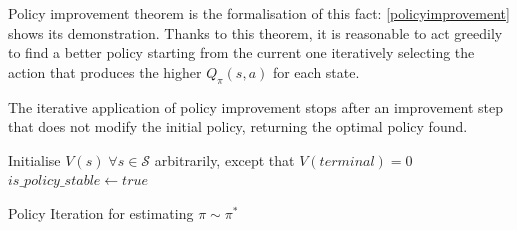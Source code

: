 Policy improvement theorem is the formalisation of this fact: \vref{policyimprovement} shows its demonstration. Thanks to this theorem, it is reasonable to act greedily to find a better policy starting from the current one iteratively selecting the action that produces the higher  $Q_\pi(s, a)$ for each state.


The iterative application of policy improvement stops after an improvement step that does not modify the initial policy, returning the optimal policy found.

\begin{algorithm}[!htp]
	\SetAlgoLined
	\DontPrintSemicolon
	\LinesNumbered
	Initialise $V(s) \; \forall s \in \mathcal{S}$ arbitrarily, except that $V(terminal) = 0$\;
	$is\_policy\_stable \leftarrow true$\;
	\caption{Policy Iteration for estimating $\pi \sim \pi^*$}
	\label{policy_evaluation}
\end{algorithm}

